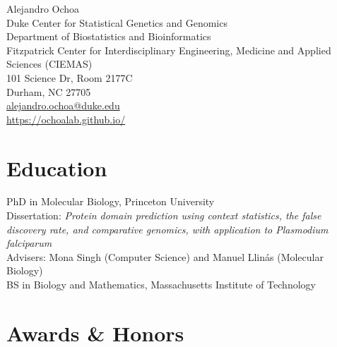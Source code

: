 \documentclass[12pt]{article} %
\newcommand{\years}[1]{\marginnote{\scriptsize #1}} %
\begin{document}
\begin{center}
  {\LARGE Alejandro Ochoa}\\[0.5cm] %
  Duke Center for Statistical Genetics and Genomics\\
  Department of Biostatistics and Bioinformatics\\
  Fitzpatrick Center for Interdisciplinary Engineering, Medicine and Applied Sciences (CIEMAS)\\
  101 Science Dr, Room 2177C\\
  Durham, NC 27705\\
  \href{mailto:alejandro.ochoa@duke.edu}{alejandro.ochoa@duke.edu}\\ %
  \url{https://ochoalab.github.io/} \\ %
\end{center}



\section*{Education}

\years{2013}
PhD in Molecular Biology, Princeton University
\\
Dissertation:
\emph{Protein domain prediction using context statistics, the false discovery rate, and comparative genomics, with application to Plasmodium falciparum}
\\
Advisers:
Mona Singh (Computer Science) and Manuel Llinás (Molecular Biology)
\\
\years{2006}
\textsc{BS} in Biology and Mathematics, Massachusetts Institute of Technology

\section*{Awards \& Honors}
\end{document}
